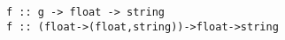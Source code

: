 \begin{verbatim}
f :: g -> float -> string
f :: (float->(float,string))->float->string
\end{verbatim}
